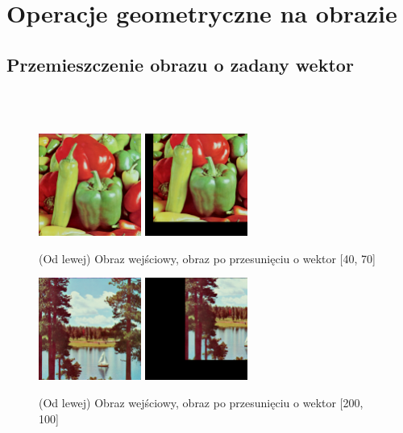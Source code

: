 \documentclass[final,a4paper,openany,12pt]{mwbk}
\begin{document}
\chapter{Operacje geometryczne na obrazie}


\section{ Przemieszczenie obrazu o zadany wektor}

\hfill
\\\\
\indent

\begin{figure}[H]
	\begin{center}
		\includegraphics[width=0.3\textwidth]{1/1Geo_Move_Original}
		\includegraphics[width=0.3\textwidth]{1/1Geo_Move_Result}
	\end{center}
	\caption{(Od lewej) Obraz wejściowy, obraz po przesunięciu o wektor [40, 70] }
\end{figure}

\begin{figure}[H]
	\begin{center}
		\includegraphics[width=0.3\textwidth]{2/2Geo_Move_Original}
		\includegraphics[width=0.3\textwidth]{2/2Geo_Move_Result}
	\end{center}
	\caption{(Od lewej) Obraz wejściowy, obraz po przesunięciu o wektor [200, 100] }
\end{figure}
\end{document}

